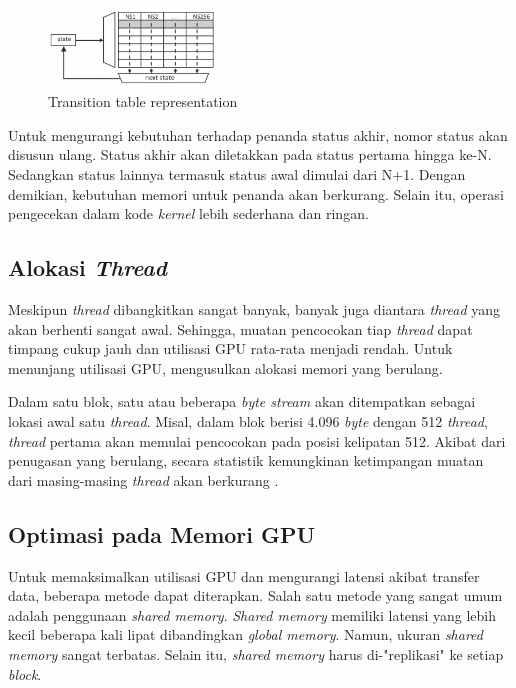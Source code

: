 \documentclass[conference]{IEEEtran}
\begin{document}
        \begin{figure}[htbp]
            \centerline{\includegraphics[width=0.4\textwidth]{../src/resources/table.png}}
            \caption{Transition table representation}
            \label{table}
        \end{figure}

        Untuk mengurangi kebutuhan terhadap penanda status akhir, nomor status akan disusun ulang. Status akhir akan diletakkan pada status pertama hingga ke-N. Sedangkan status lainnya termasuk status awal dimulai dari N+1. Dengan demikian, kebutuhan memori untuk penanda akan berkurang. Selain itu, operasi pengecekan dalam kode \emph{kernel} lebih sederhana dan ringan.

    \subsection{Alokasi \emph{Thread}}
        Meskipun \emph{thread} dibangkitkan sangat banyak, banyak juga diantara \emph{thread} yang akan berhenti sangat awal. Sehingga, muatan pencocokan tiap \emph{thread} dapat timpang cukup jauh dan utilisasi GPU rata-rata menjadi rendah. Untuk menunjang utilisasi GPU, \cite{lin2013} mengusulkan alokasi memori yang berulang.

        Dalam satu blok, satu atau beberapa \emph{byte stream} akan ditempatkan sebagai lokasi awal satu \emph{thread}. Misal, dalam blok berisi 4.096 \emph{byte} dengan 512 \emph{thread}, \emph{thread} pertama akan memulai pencocokan pada posisi kelipatan 512. Akibat dari penugasan yang berulang, secara statistik kemungkinan ketimpangan muatan dari masing-masing \emph{thread} akan berkurang \cite{lin2013}. 

    \subsection{Optimasi pada Memori GPU}
        Untuk memaksimalkan utilisasi GPU dan mengurangi latensi akibat transfer data, beberapa metode dapat diterapkan. Salah satu metode yang sangat umum adalah penggunaan \emph{shared memory}. \emph{Shared memory} memiliki latensi yang lebih kecil beberapa kali lipat dibandingkan \emph{global memory}. Namun, ukuran \emph{shared memory} sangat terbatas. Selain itu, \emph{shared memory} harus di-"replikasi" ke setiap \emph{block}. 
\end{document}
